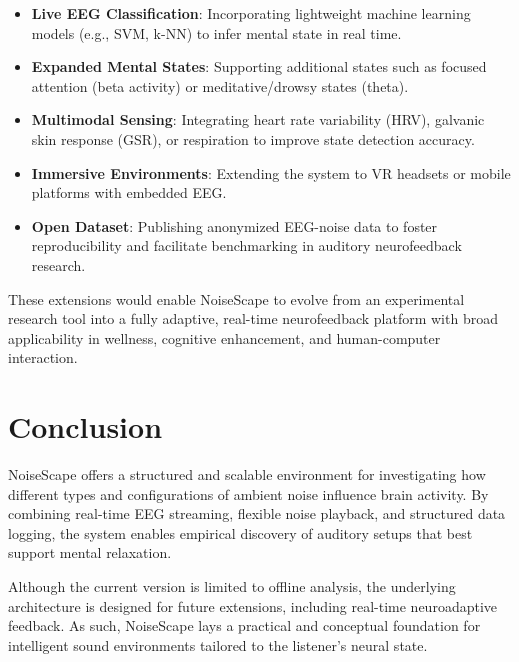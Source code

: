 \begin{itemize}
\item \textbf{Live EEG Classification}: Incorporating lightweight machine learning models (e.g., SVM, k-NN) to infer mental state in real time.
\item \textbf{Expanded Mental States}: Supporting additional states such as focused attention (beta activity) or meditative/drowsy states (theta).
\item \textbf{Multimodal Sensing}: Integrating heart rate variability (HRV), galvanic skin response (GSR), or respiration to improve state detection accuracy.
\item \textbf{Immersive Environments}: Extending the system to VR headsets or mobile platforms with embedded EEG.
\item \textbf{Open Dataset}: Publishing anonymized EEG-noise data to foster reproducibility and facilitate benchmarking in auditory neurofeedback research.
\end{itemize}

These extensions would enable NoiseScape to evolve from an experimental research tool into a fully adaptive, real-time neurofeedback platform with broad applicability in wellness, cognitive enhancement, and human-computer interaction.








\section{Conclusion}

NoiseScape offers a structured and scalable environment for investigating how different types and configurations of ambient noise influence brain activity. By combining real-time EEG streaming, flexible noise playback, and structured data logging, the system enables empirical discovery of auditory setups that best support mental relaxation.

Although the current version is limited to offline analysis, the underlying architecture is designed for future extensions, including real-time neuroadaptive feedback. As such, NoiseScape lays a practical and conceptual foundation for intelligent sound environments tailored to the listener’s neural state.

